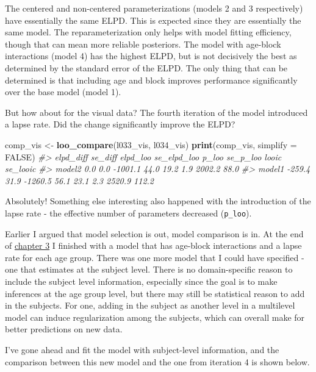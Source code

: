 \documentclass[11pt, oneside, openany]{scrbook}
\newenvironment{Shaded}{\begin{snugshade}}{\end{snugshade}}
\newcommand{\CommentTok}[1]{\textcolor[rgb]{0.56,0.35,0.01}{\textit{#1}}}
\newcommand{\DataTypeTok}[1]{\textcolor[rgb]{0.13,0.29,0.53}{#1}}
\newcommand{\KeywordTok}[1]{\textcolor[rgb]{0.13,0.29,0.53}{\textbf{#1}}}
\newcommand{\NormalTok}[1]{#1}
\newcommand{\OtherTok}[1]{\textcolor[rgb]{0.56,0.35,0.01}{#1}}
\newcommand{\StringTok}[1]{\textcolor[rgb]{0.31,0.60,0.02}{#1}}
\begin{document}
The centered and non-centered parameterizations (models 2 and 3 respectively) have essentially the same ELPD. This is expected since they are essentially the same model. The reparameterization only helps with model fitting efficiency, though that can mean more reliable posteriors. The model with age-block interactions (model 4) has the highest ELPD, but is not decisively the best as determined by the standard error of the ELPD. The only thing that can be determined is that including age and block improves performance significantly over the base model (model 1).

But how about for the visual data? The fourth iteration of the model introduced a lapse rate. Did the change significantly improve the ELPD?

\begin{Shaded}
\begin{Highlighting}[]
\NormalTok{comp_vis <-}\StringTok{ }\KeywordTok{loo_compare}\NormalTok{(l033_vis, l034_vis)}
\KeywordTok{print}\NormalTok{(comp_vis, }\DataTypeTok{simplify =} \OtherTok{FALSE}\NormalTok{)}
\CommentTok{#>        elpd_diff se_diff elpd_loo se_elpd_loo p_loo   se_p_loo looic   se_looic}
\CommentTok{#> model2     0.0       0.0 -1001.1     44.0        19.2     1.9   2002.2    88.0 }
\CommentTok{#> model1  -259.4      31.9 -1260.5     56.1        23.1     2.3   2520.9   112.2}
\end{Highlighting}
\end{Shaded}

Absolutely! Something else interesting also happened with the introduction of the lapse rate - the effective number of parameters decreased (\texttt{p\_loo}).

Earlier I argued that model selection is out, model comparison is in. At the end of \protect\hyperlink{workflow}{chapter 3} I finished with a model that has age-block interactions and a lapse rate for each age group. There was one more model that I could have specified - one that estimates at the subject level. There is no domain-specific reason to include the subject level information, especially since the goal is to make inferences at the age group level, but there may still be statistical reason to add in the subjects. For one, adding in the subject as another level in a multilevel model can induce regularization among the subjects, which can overall make for better predictions on new data.

I've gone ahead and fit the model with subject-level information, and the comparison between this new model and the one from iteration 4 is shown below.
\end{document}
